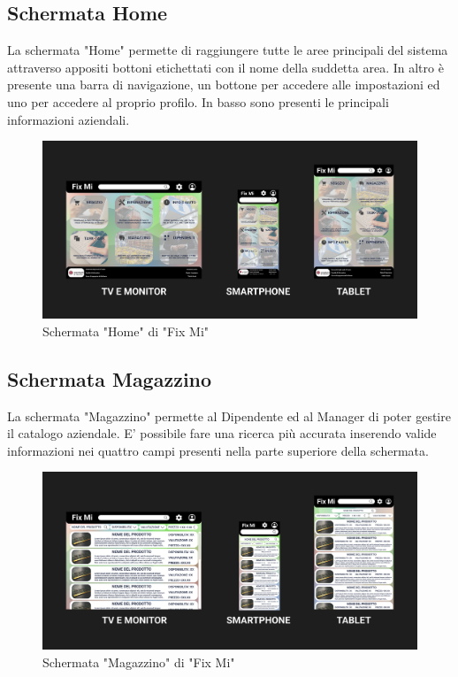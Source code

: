\documentclass{report}
\begin{document}
\subsection*{Schermata Home}

La schermata "Home" permette di raggiungere tutte le aree principali del sistema attraverso appositi bottoni etichettati con il nome della suddetta area. In altro è presente una barra di navigazione, un bottone per accedere alle impostazioni ed uno per accedere al proprio profilo. In basso sono presenti le principali informazioni aziendali.

\begin{figure}[H]
	\centering
	\includegraphics[width=1\textwidth]{images/Snapshots/mainpage_snapshot.png}
	\caption{Schermata "Home" di "Fix Mi"}
\end{figure}	

\subsection*{Schermata Magazzino}
La schermata "Magazzino" permette al Dipendente ed al Manager di poter gestire il catalogo aziendale. E' possibile fare una ricerca più accurata inserendo valide informazioni nei quattro campi presenti nella parte superiore della schermata.

\begin{figure}[H]
	\centering
	\includegraphics[width=1\textwidth]{images/Snapshots/magazzino_snapshot.png}
	\caption{Schermata "Magazzino" di "Fix Mi"}
\end{figure}	
\end{document}
